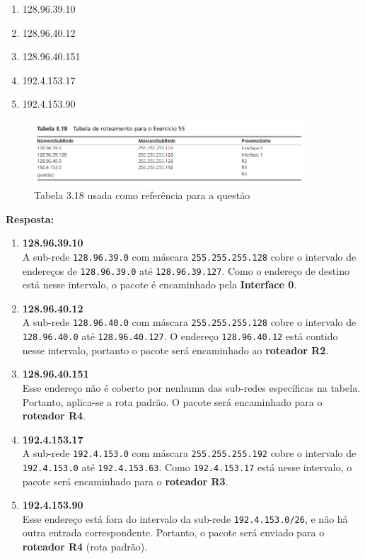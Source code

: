 \begin{enumerate}[label=\alph*.]
    \item 128.96.39.10
    \item 128.96.40.12
    \item 128.96.40.151
    \item 192.4.153.17
    \item 192.4.153.90
\end{enumerate}

\begin{figure}[H]
    \centering
    \includegraphics[width=0.9\textwidth]{images/tabela_3_18.png}
    \caption{Tabela 3.18 usada como referência para a questão} 
    \label{fig:questao_2_tabela}
\end{figure}

\textbf{Resposta:}
\begin{enumerate}[label=\textbf{\alph*}.]
    \item \textbf{128.96.39.10} \\
    A sub-rede \texttt{128.96.39.0} com máscara \texttt{255.255.255.128} cobre o intervalo de endereços de \texttt{128.96.39.0} até \texttt{128.96.39.127}. Como o endereço de destino está nesse intervalo, o pacote é encaminhado pela \textbf{Interface 0}.
    
    \item \textbf{128.96.40.12} \\
    A sub-rede \texttt{128.96.40.0} com máscara \texttt{255.255.255.128} cobre o intervalo de \texttt{128.96.40.0} até \texttt{128.96.40.127}. O endereço \texttt{128.96.40.12} está contido nesse intervalo, portanto o pacote será encaminhado ao \textbf{roteador R2}.
    
    \item \textbf{128.96.40.151} \\
    Esse endereço não é coberto por nenhuma das sub-redes específicas na tabela. Portanto, aplica-se a rota padrão. O pacote será encaminhado para o \textbf{roteador R4}.
    
    \item \textbf{192.4.153.17} \\
    A sub-rede \texttt{192.4.153.0} com máscara \texttt{255.255.255.192} cobre o intervalo de \texttt{192.4.153.0} até \texttt{192.4.153.63}. Como \texttt{192.4.153.17} está nesse intervalo, o pacote será encaminhado para o \textbf{roteador R3}.
    
    \item \textbf{192.4.153.90} \\
    Esse endereço está fora do intervalo da sub-rede \texttt{192.4.153.0/26}, e não há outra entrada correspondente. Portanto, o pacote será enviado para o \textbf{roteador R4} (rota padrão).
\end{enumerate}

